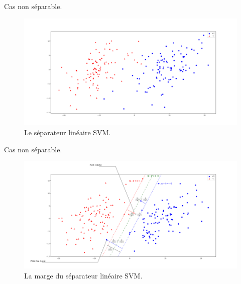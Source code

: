 \documentclass[8pt]{beamer}
\begin{document}
		\begin{frame}{Cas non séparable.}
			\begin{figure}[H]
				\includegraphics[width=\textwidth]{images/samples/non_separable}
				\caption*{\label{fig::non_sep} Le séparateur linéaire SVM.}
			\end{figure}
		\end{frame}

		\begin{frame}{Cas non séparable.}
			\begin{figure}[H]
				\includegraphics[width=\textwidth]{images/samples/stable_margin}
				\caption*{\label{fig::stable_margin} La marge du séparateur linéaire SVM.}
			\end{figure}
		\end{frame}
\end{document}
